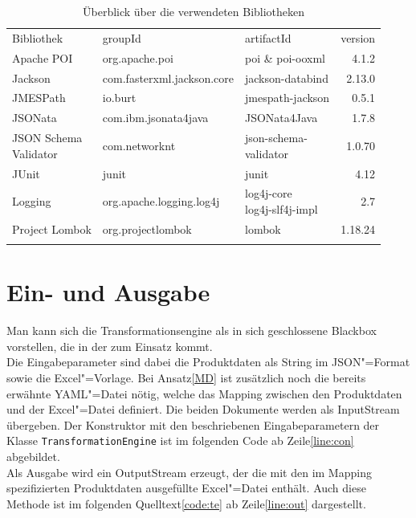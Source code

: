 \begin{table}[htbp]
\centering
\begin{tabular}[c]{|l|l|l|r|} 
\hhline{----}
Bibliothek & groupId & artifactId & version\TBstrut\\
\hhline{====}
Apache POI & org.apache.poi & poi \& poi-ooxml & 4.1.2\Tstrut\\
Jackson & com.fasterxml.jackson.core & jackson-databind & 2.13.0\\
JMESPath & io.burt & jmespath-jackson & 0.5.1\\
JSONata & com.ibm.jsonata4java & JSONata4Java & 1.7.8\\
\makecell[l]{JSON Schema\\[-0.15cm] Validator} & com.networknt & \makecell[l]{json-schema-\\[-0.15cm] validator} & 1.0.70\\
JUnit & junit & junit & 4.12\\
Logging & org.apache.logging.log4j & \makecell[l]{log4j-core\\[-0.15cm] log4j-slf4j-impl} & 2.7\\
Project Lombok & org.projectlombok & lombok & 1.18.24\Bstrut\\
\hhline{----}
\end{tabular}
\caption{Überblick über die verwendeten Bibliotheken}\label{tab:bib}
\end{table}

\section[Ein- und Ausgabeparameter]{Ein- und Ausgabe}
Man kann sich die Transformationsengine als in sich geschlossene Blackbox vorstellen, die in der  zum Einsatz kommt. \\
Die Eingabeparameter sind dabei die Produktdaten als String im JSON"=Format sowie die Excel"=Vorlage. Bei Ansatz\nbs\ref{MD} ist zusätzlich noch die bereits erwähnte YAML"=Datei nötig, welche das Mapping zwischen den Produktdaten und der Excel"=Datei definiert. Die beiden Dokumente werden als InputStream übergeben. Der Konstruktor mit den beschriebenen Eingabeparametern der Klasse \texttt{TransformationEngine} ist im folgenden Code ab Zeile\nbs\ref{line:con} abgebildet.\\
Als Ausgabe wird ein OutputStream erzeugt, der die mit den im Mapping spezifizierten Produktdaten ausgefüllte Excel"=Datei enthält. Auch diese Methode ist im folgenden Quelltext\nbs\ref{code:te} ab Zeile\nbs\ref{line:out} dargestellt. 

